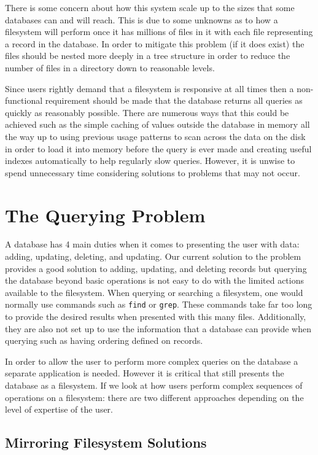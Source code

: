 There is some concern about how this system scale up to the sizes that some
databases can and will reach. This is due to some unknowns as to how
a filesystem will perform once it has millions of files in it with each file
representing a record in the database. In order to mitigate this problem (if it
does exist) the files should be nested more deeply in a tree structure in order
to reduce the number of files in a directory down to reasonable levels.

Since users rightly demand that a filesystem is responsive at all times then
a non-functional requirement should be made that the database returns all
queries as quickly as reasonably possible. There are numerous ways that this
could be achieved such as the simple caching of values outside the database in
memory all the way up to using previous usage patterns to scan across the data
on the disk in order to load it into memory before the query is ever made and
creating useful indexes automatically to help regularly slow queries. However,
it is unwise to spend unnecessary time considering solutions to problems that
may not occur.

\section{The Querying Problem}
\label{sec:queryproblem}

A database has 4 main duties when it comes to presenting the user with data:
adding, updating, deleting, and updating. Our current solution to the problem
provides a good solution to adding, updating, and deleting records but querying
the database beyond basic operations is not easy to do with the limited actions
available to the filesystem. When querying or searching a filesystem, one would
normally use commands such as \texttt{find} or \texttt{grep}. These commands
take far too long to provide the desired results when presented with this many
files. Additionally, they are also not set up to use the information that
a database can provide when querying such as having ordering defined on
records.

In order to allow the user to perform more complex queries on the database
a separate application is needed. However it is critical that still presents
the database as a filesystem. If we look at how users perform complex sequences
of operations on a filesystem: there are two different approaches depending on
the level of expertise of the user.

\subsection{Mirroring Filesystem Solutions}

